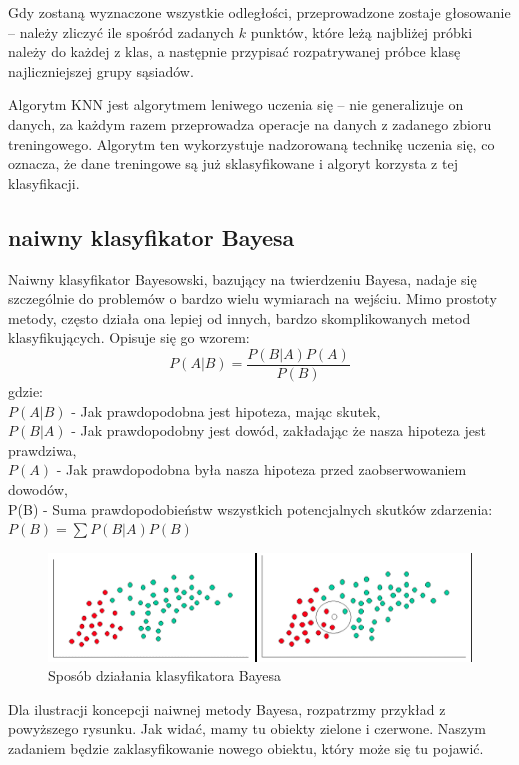\documentclass[12pt,a4paper]{article}
\begin{document}
	       Gdy zostaną wyznaczone wszystkie odległości, przeprowadzone zostaje głosowanie -- należy zliczyć ile spośród zadanych $k$ punktów, które leżą najbliżej próbki należy do każdej z klas, a następnie przypisać rozpatrywanej próbce klasę najliczniejszej grupy sąsiadów.
	       
	       Algorytm KNN jest algorytmem leniwego uczenia się -- nie generalizuje on danych, za każdym razem przeprowadza operacje na danych z zadanego zbioru treningowego. Algorytm ten wykorzystuje nadzorowaną technikę uczenia się, co oznacza, że dane treningowe są już sklasyfikowane i algoryt korzysta z tej klasyfikacji.
	    
	    \subsection{naiwny klasyfikator Bayesa}
	        Naiwny klasyfikator Bayesowski, bazujący na twierdzeniu Bayesa, nadaje się szczególnie do problemów o bardzo wielu wymiarach na wejściu. Mimo prostoty metody, często działa ona lepiej od innych, bardzo skomplikowanych metod klasyfikujących. Opisuje się go wzorem:
	            $$P(A|B)=\frac{P(B|A)P(A)}{P(B)}$$
	        gdzie:\\ $P(A|B)$ - Jak prawdopodobna jest hipoteza, mając skutek,\\$P(B|A)$ - Jak prawdopodobny jest dowód, zakładając że nasza hipoteza jest prawdziwa,\\ $P(A)$ - Jak prawdopodobna była nasza hipoteza przed zaobserwowaniem dowodów, \\ P(B) - Suma prawdopodobieństw wszystkich potencjalnych skutków zdarzenia:\\ $P(B)=\sum P(B|A)P(B)$ \\
	        
	        \begin{figure}[h!]
    			\center	
    			\includegraphics[width=.7\textwidth]{img/bayes_rysunek.png}
    			\caption{Sposób działania klasyfikatora Bayesa}
		    \end{figure} 
	        
	        Dla ilustracji koncepcji naiwnej metody Bayesa, rozpatrzmy przykład z powyższego rysunku. Jak widać, mamy tu obiekty zielone i czerwone. Naszym zadaniem będzie zaklasyfikowanie nowego obiektu, który może się tu pojawić.
\end{document}
